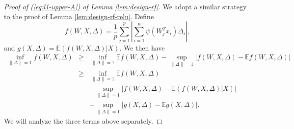 \begin{proof}[Proof of (\ref{eq:l1-upper-A}) of Lemma \ref{lem:design-rf}]
We adopt a similar strategy to the proof of Lemma \ref{lem:design-rf-relu}. Define
$$f(W,X,\Delta)=\frac{1}{p}\sum_{j=1}^p\left|\sum_{i=1}^n\psi(W_j^Tx_i)\Delta_i\right|,$$
and $g(X,\Delta)=\mathbb{E}(f(W,X,\Delta)|X)$.
We then have
\begin{eqnarray}
\nonumber \inf_{\|\Delta\|=1}f(W,X,\Delta) &\geq& \inf_{\|\Delta\|=1}\mathbb{E}f(W,X,\Delta) - \sup_{\|\Delta\|=1}\left|f(W,X,\Delta)-\mathbb{E}f(W,X,\Delta)\right| \\
\label{eq:exp-f-inf} &\geq& \inf_{\|\Delta\|=1}\mathbb{E}f(W,X,\Delta) \\
\label{eq:ep-f} && - \sup_{\|\Delta\|=1}\left|f(W,X,\Delta)-\mathbb{E}(f(W,X,\Delta)|X)\right| \\
\label{eq:ep-g} && - \sup_{\|\Delta\|=1}\left|g(X,\Delta)-\mathbb{\mathbb{E}}g(X,\Delta)\right|.
\end{eqnarray}
We will analyze the three terms above separately.


\end{proof}
